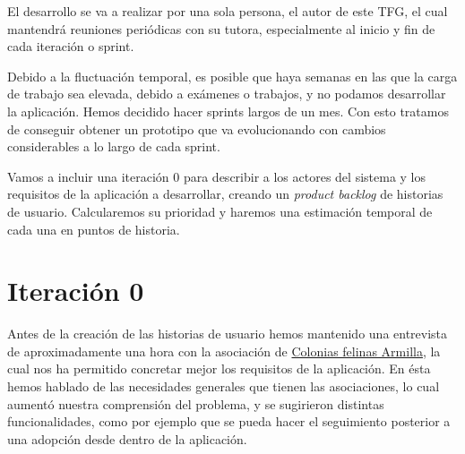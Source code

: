 El desarrollo se va a realizar por una sola persona, el autor de este TFG, el cual mantendrá reuniones periódicas con su tutora, especialmente al inicio y fin de cada iteración o sprint.

Debido a la fluctuación temporal, es posible que haya semanas en las que la carga de trabajo sea elevada, debido a exámenes o trabajos, y no podamos desarrollar la aplicación. Hemos decidido hacer sprints largos de un mes. Con esto tratamos de conseguir obtener un prototipo que va evolucionando con cambios considerables a lo largo de cada sprint.

Vamos a incluir una iteración 0 para describir a los actores del sistema y los requisitos de la aplicación a desarrollar, creando un \textit{product backlog} de historias de usuario. Calcularemos  su prioridad y haremos una estimación temporal de cada una en puntos de historia.  

\section{Iteración 0} \label{it0}

Antes de la creación de las historias de usuario hemos mantenido una entrevista de aproximadamente una hora con la asociación de \href{https://www.instagram.com/coloniasfelinasarmilla/}{Colonias felinas Armilla}, la cual nos ha permitido concretar mejor los requisitos de la aplicación. En ésta hemos hablado de las necesidades generales que tienen las asociaciones, lo cual aumentó nuestra comprensión del problema, y se sugirieron distintas funcionalidades, como por ejemplo que se pueda hacer el seguimiento posterior a una adopción desde dentro de la aplicación.

